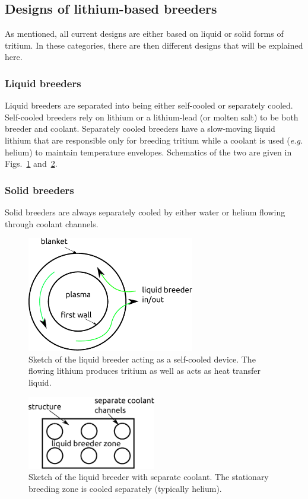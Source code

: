 \documentclass[11pt]{report} %
\begin{document}
\subsection{Designs of lithium-based breeders}
As mentioned, all current designs are either based on liquid or solid forms of tritium. In these categories, there are then different designs that will be explained here.
\subsubsection{Liquid breeders}
Liquid breeders are separated into being either self-cooled or separately cooled. Self-cooled breeders rely on lithium or a lithium-lead (or molten salt) to be both breeder and coolant. Separately cooled breeders have a slow-moving liquid lithium that are responsible only for breeding tritium while a coolant is used ({\it e.g.} helium) to maintain temperature envelopes. Schematics of the two are given in Figs.~\ref{fig:selfCooled} and~\ref{fig:separateCooled}.
\subsubsection{Solid breeders}
Solid breeders are always separately cooled by either water or helium flowing through coolant channels. 

\begin{figure}
\centering
\includegraphics[width=0.65\textwidth]{../images/simplified_self_cooled.eps} 
\caption{Sketch of the liquid breeder acting as a self-cooled device. The flowing lithium produces tritium as well as acts as heat transfer liquid.}
\label{fig:selfCooled}
\end{figure}
\begin{figure}
\centering
\includegraphics[width=0.5\textwidth]{../images/simplified_separately_cooled.eps} 
\caption{Sketch of the liquid breeder with separate coolant. The stationary breeding zone is cooled separately (typically helium).}
\label{fig:separateCooled}
\end{figure}
\end{document}
